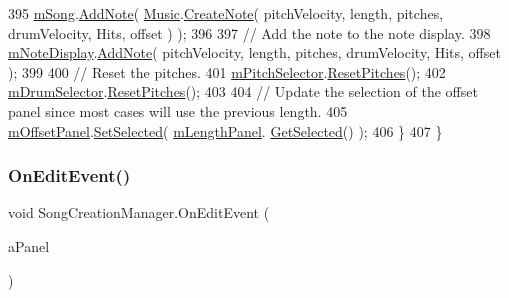 \begin{DoxyCode}
395             \hyperlink{group___s_c_m_priv_var_gabd8329149faef65a689650d951a9abc9}{mSong}.\hyperlink{group___song_pub_func_gab7c8fe4dc29f5ae7b7728c583fe51f7e}{AddNote}( \hyperlink{class_music}{Music}.\hyperlink{group___music_stat_func_gaaf74885e43eb623f64f961985fadcd08}{CreateNote}( pitchVelocity, length, pitches, 
      drumVelocity, Hits, offset ) );
396 
397             \textcolor{comment}{// Add the note to the note display.}
398             \hyperlink{group___s_c_m_priv_var_ga308f19d1b2020fc625c12dd08ee16b1c}{mNoteDisplay}.\hyperlink{group___s_c___n_d_c_pub_func_ga43e58800daae0e46bbe1b86d78c2f677}{AddNote}( pitchVelocity, length, pitches, drumVelocity, Hits, 
      offset );
399 
400             \textcolor{comment}{// Reset the pitches.}
401             \hyperlink{group___s_c_m_priv_var_gab84821120cace4099edfb42c52d2af63}{mPitchSelector}.\hyperlink{group___s_c___p_s_c_pub_func_ga678ef561c5418e4bf43a5f9ed753f0f0}{ResetPitches}();
402             \hyperlink{group___s_c_m_priv_var_gac8be873b8259a0ddf76b4fa6d7d2d072}{mDrumSelector}.\hyperlink{group___s_c___p_s_c_pub_func_ga678ef561c5418e4bf43a5f9ed753f0f0}{ResetPitches}();
403 
404             \textcolor{comment}{// Update the selection of the offset panel since most cases will use the previous length.}
405             \hyperlink{group___s_c_m_priv_var_ga86a44007a4b127d7aa61f75dd34a3409}{mOffsetPanel}.\hyperlink{group___s_c_m_nest_class_ab3d74be007528e4e6686f89e8e993b3b}{SetSelected}( \hyperlink{group___s_c_m_priv_var_gadb8dedf80fbe474a1c94cdc95d088a6f}{mLengthPanel}.
      \hyperlink{group___s_c_m_nest_class_ae73f2b2c2f567ecaf6ce10f85c30956a}{GetSelected}() );
406         \}
407     \}
\end{DoxyCode}
\mbox{\label{group___s_c_m_handlers_gacb552a4f02b22d7c10a8420eb1431201}} 
\subsubsection{\texorpdfstring{On\+Edit\+Event()}{OnEditEvent()}}
{\footnotesize\ttfamily void Song\+Creation\+Manager.\+On\+Edit\+Event (\begin{DoxyParamCaption}\item[{\hyperlink{class_s_c___note_display_panel}{S\+C\+\_\+\+Note\+Display\+Panel}}]{a\+Panel }\end{DoxyParamCaption})}



